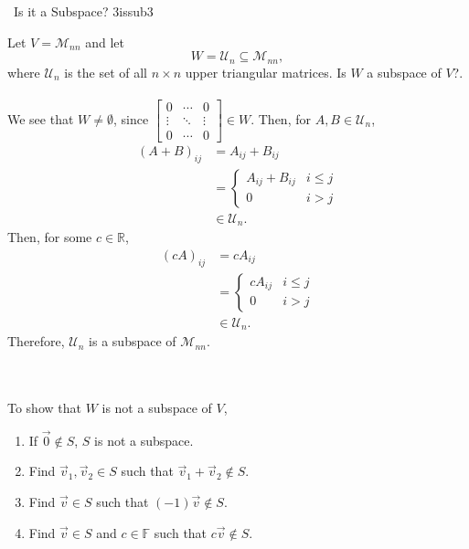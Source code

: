         \begin{example}{\Difficulty\,\Difficulty\,\,Is it a Subspace? 3}{issub3}

            Let \(V=\mathcal{M}_{nn}\) and let
            \begin{equation*}
                W=\mathcal{U}_n\subseteq\mathcal{M}_{nn},
            \end{equation*}
            where \(\mathcal{U}_n\) is the set of all \(n\times n\) upper triangular matrices. Is \(W\) a subspace of \(V\)?.
            \\
            \\
            We see that \(W\neq\emptyset\), since \(\begin{bmatrix} 0 & \cdots & 0 \\ \vdots & \ddots & \vdots \\ 0 & \cdots & 0 \end{bmatrix}\in W\). Then,
            for \(A,B\in\mathcal{U}_n\), 
            \begin{align*}
                (A+B)_{ij}&=A_{ij}+B_{ij} \\
                &=\begin{cases}
                    A_{ij}+B_{ij} & i\leq j \\
                    0 & i > j
                \end{cases} \\
                &\in\mathcal{U}_n.
            \end{align*}
            Then, for some \(c\in\mathbb{R}\),
            \begin{align*}
                (cA)_{ij}&=cA_{ij} \\
                &=\begin{cases}
                    cA_{ij} & i\leq j \\
                    0 & i > j
                \end{cases} \\
                &\in\mathcal{U}_n.
            \end{align*}
            Therefore, \(\mathcal{U}_n\) is a subspace of \(\mathcal{M}_{nn}\).
        \end{example}
        \vphantom
        \\
        \\
        To show that \(W\) is not a subspace of \(V\),
        \begin{enumerate}
            \item If \(\vec{0}\nin S\), \(S\) is not a subspace.
            \item Find \(\vec{v}_1,\vec{v}_2\in S\) such that \(\vec{v}_1+\vec{v}_2\nin S\).
            \item Find \(\vec{v}\in S\) such that \((-1)\vec{v}\nin S\).
            \item Find \(\vec{v}\in S\) and \(c\in\mathbb{F}\) such that \(c\vec{v}\nin S\).
        \end{enumerate}
